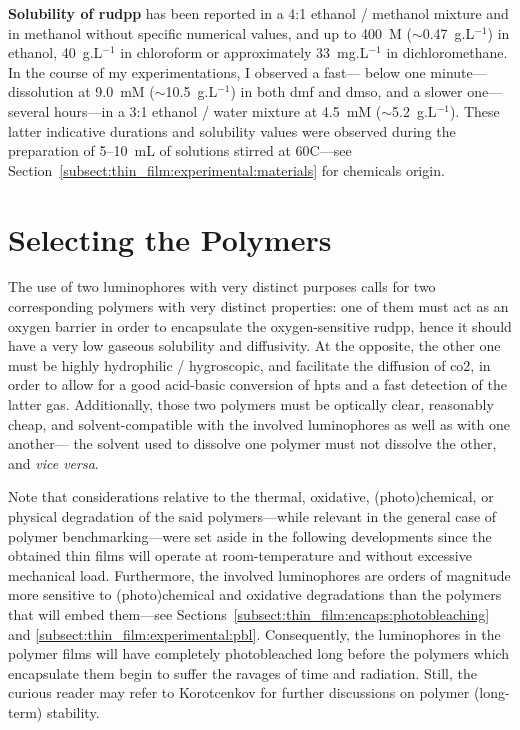 \textbf{Solubility of \gls{rudpp}} has been reported in a 4:1 ethanol / methanol mixture\cite{alford1985} and in methanol\cite{demas1977} without specific numerical values, and up to 400~{\textmu}M ($\sim$0.47~g.L$^{-1}$) in ethanol\cite{baker2000}, 40~g.L$^{-1}$ in chloroform\cite{khan2015} or approximately 33~mg.L$^{-1}$ in dichloromethane\cite{xu1994}. In the course of my experimentations, I observed a fast---\ie{} below one minute---dissolution at 9.0~mM ($\sim$10.5~g.L$^{-1}$) in both \gls{dmf} and \gls{dmso}, and a slower one---\ie{} several hours---in a 3:1 ethanol / water mixture at 4.5~mM ($\sim$5.2~g.L$^{-1}$). These latter indicative durations and solubility values were observed during the preparation of 5--10~mL of solutions stirred at 60{\degree}C---see Section~\ref{subsect:thin_film:experimental:materials} for chemicals origin.

\section{Selecting the Polymers}\label{sect:thin_film:select_poly}

The use of two luminophores with very distinct purposes calls for two corresponding polymers with very distinct properties: one of them must act as an oxygen barrier in order to encapsulate the oxygen-sensitive \gls{rudpp}, hence it should have a very low gaseous solubility and diffusivity. At the opposite, the other one must be highly hydrophilic / hygroscopic, and facilitate the diffusion of \gls{co2}, in order to allow for a good acid-basic conversion of \gls{hpts} and a fast detection of the latter gas. Additionally, those two polymers must be optically clear, reasonably cheap, and solvent-compatible with the involved luminophores as well as with one another---\ie{} the solvent used to dissolve one polymer must not dissolve the other, and \textit{vice versa}.

Note that considerations relative to the thermal, oxidative, (photo)chemical, or physical degradation of the said polymers---while relevant in the general case of polymer benchmarking---were set aside in the following developments since the obtained thin films will operate at room-temperature and without excessive mechanical load. Furthermore, the involved luminophores are orders of magnitude more sensitive to (photo)chemical and oxidative degradations than the polymers that will embed them---see Sections~\ref{subsect:thin_film:encaps:photobleaching} and \ref{subsect:thin_film:experimental:pbl}. Consequently, the luminophores in the polymer films will have completely photobleached long before the polymers which encapsulate them begin to suffer the ravages of time and radiation. Still, the curious reader may refer to Korotcenkov for further discussions on polymer (long-term) stability\cite[Chap.~9]{korotcenkov2014}.

